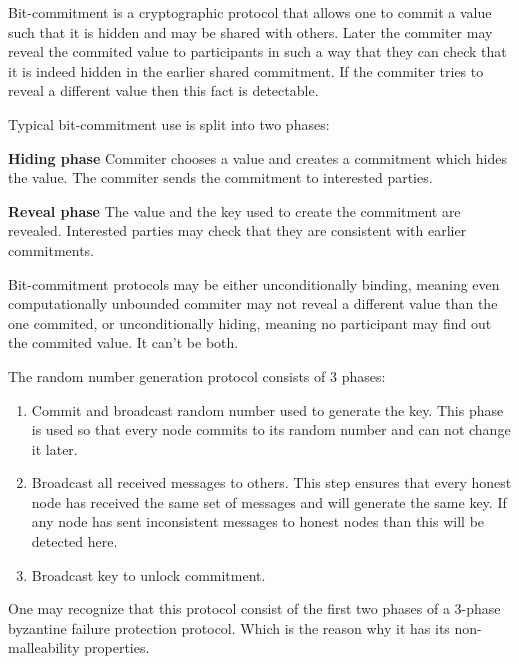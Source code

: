 \begin{defin*}
  Bit-commitment is a cryptographic protocol that allows one to commit a value
  such that it is hidden and may be shared with others. Later the commiter may
  reveal the commited value to participants in such a way that they can check
  that it is indeed hidden in the earlier shared commitment. If the commiter
  tries to reveal a different value then this fact is detectable.

  Typical bit-commitment use is split into two phases:
  \begin{description}
    \item{\textbf{Hiding phase}} Commiter chooses a value and creates a
      commitment which hides the value. The commiter sends the commitment to
      interested parties.
    \item{\textbf{Reveal phase}} The value and the key used to create the
      commitment are revealed. Interested parties may check that they are
      consistent with earlier commitments.
  \end{description}

  Bit-commitment protocols may be either unconditionally binding, meaning even
  computationally unbounded commiter may not reveal a different value than the
  one commited, or unconditionally hiding, meaning no participant may find out
  the commited value. It can't be both.
\end{defin*}

The random number generation protocol consists of 3 phases:
\begin{enumerate}
  \item Commit and broadcast random number used to generate the key. This phase
    is used so that every node commits to its random number and can not change
    it later.
  \item Broadcast all received messages to others. This step ensures that every
    honest node has received the same set of messages and will generate the same
    key. If any node has sent inconsistent messages to honest nodes
    than this will be detected here.
  \item Broadcast key to unlock commitment.
\end{enumerate}

One may recognize that this protocol consist of the first two phases of a
3-phase byzantine failure protection protocol. Which is the reason why it has
its non-malleability properties.

